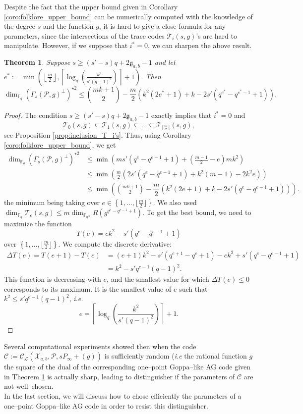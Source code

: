 \documentclass[a4paper]{article}
\newtheorem{thm}{Theorem}[section]
\theoremstyle{definition}
\theoremstyle{remark}
\newcommand{\calP}{\mathcal{P}}
\newcommand{\calL}{\mathcal{L}}
\newcommand{\calC}{\mathcal{C}}
\newcommand{\calT}{\mathcal{T}}
\newcommand{\calX}{\mathcal{X}}
\newcommand{\fqm}{\mathbb{F}_{q^m}}
\newcommand{\fq}{\mathbb{F}_{q}}
\newcommand{\set}[1]{\left\{#1\right\}}
\begin{document}
Despite the fact that the upper bound given in Corollary \ref{coro:folklore_upper_bound} can be numerically computed with the knowledge of the degree $s$ and the function $g$, it is hard to give a close formula for any parameters, since the intersections of the trace codes $\calT_i(s,g)$'s are hard to manipulate. However, if we suppose that $i^*=0$, we can sharpen the above result.
\begin{thm} \label{thm:bound_with_T_i's_inclusion}
Suppose $s \geq (s'-s)q+2\mathfrak{g}_{a,b}-1$ and let $e^* := \min\left(\left\lfloor \frac{m}{2} \right\rfloor, \left\lceil \log_q\left(\frac{k^2}{s'(q-1)^2}\right)\right\rceil+1\right)$. Then
$$\dim_{\fq} (\Gamma_s(\calP,g)^{\perp})^{\star 2}\leq \binom{mk+1}{2} - \dfrac{m}{2}(k^2(2e^*+1)+k-2s'(q^{e^*}-q^{e^*-1}+1)). $$
\end{thm}
\begin{proof}
The condition $s \geq (s'-s)q+2\mathfrak{g}_{a,b}-1$ exactly implies that $i^*=0$ and $$\calT_0(s,g) \subseteq \calT_1(s,g) \subseteq \dots \subseteq \calT_{\lfloor \frac{m}{2}\rfloor}(s,g),$$ 
see Proposition \ref{prop:inclusion_T_i's}. Thus, using Corollary \ref{coro:folklore_upper_bound}, we get
\begin{align*}
        \dim_{\fq} (\Gamma_s(\calP,g)^{\perp})^{\star 2}
        & \leq \min \left(ms'(q^e-q^{e-1}+1) + \left( \frac{m-1}{2} -e \right)mk^2 \right)\\
        & \leq \min \left(\frac{m}{2}\left(2s'(q^e-q^{e-1}+1)+k^2(m-1)-2k^2e  \right)\right) \\
        & \leq \min\left(\binom{mk+1}{2} - \dfrac{m}{2}\left(k^2(2e+1)+k-2s'(q^e-q^{e-1}+1)\right)\right).
\end{align*}
the minimum being taking over $e \in \set{1,\dots,\lfloor \frac{m}{2} \rfloor}$. We also used $\dim_{\fq}\calT_e(s,g) \leq m \dim_{\fqm} R(g^{q^e-q^{e-1}+1})$.
To get the best bound, we need to maximize the function
$$T(e) = ek^2-s'(q^e-q^{e-1}+1)$$
over $\set{1,\dots,\lfloor \frac{m}{2} \rfloor}$.
We compute the discrete derivative:
\begin{align*}
    \Delta T(e) = T(e+1)-T(e) &= (e+1)k^2- s'(q^{e+1}-q^e+1) - ek^2 + s'(q^e-q^{e-1}+1) \\
                              &= k^2 - s'q^{e-1}(q-1)^2.
\end{align*}
This function is decreasing with $e$, and the smallest value for which $\Delta T(e) \leq 0$ corresponds to its maximum. It is the smallest value of $e$ such that $k^2 \leq s'q^{e-1}(q-1)^2$, \emph{i.e.}
$$e =  \left\lceil \log_q\left(\dfrac{k^2}{s'(q-1)^2}\right)\right\rceil+1.$$
\end{proof}
\noindent Several computational experiments showed then when the code $\calC:=\calC_{\calL}(\calX_{a,b},\calP,sP_\infty+(g))$ is sufficiently random (\emph{i.e} the rational function $g$ the square of the dual of the corresponding one--point Goppa--like AG code given in Theorem \ref{thm:bound_with_T_i's_inclusion} is actually sharp, leading to  distinguisher if the parameters of $\calC$ are not well--chosen. \\
In the last section, we will discuss how to chose efficiently the parameters of a one--point Goppa--like AG code in order to resist this distinguisher.
\end{document}
